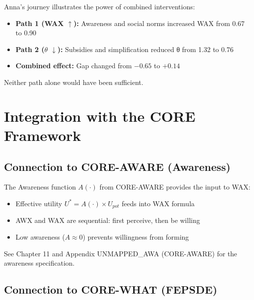 \begin{intuition}
Anna's journey illustrates the power of combined interventions:
\begin{itemize}[nosep]
  \item \textbf{Path 1 (WAX $\uparrow$):} Awareness and social norms increased WAX from 0.67 to 0.90
  \item \textbf{Path 2 ($\theta$ $\downarrow$):} Subsidies and simplification reduced θ from 1.32 to 0.76
  \item \textbf{Combined effect:} Gap changed from $-0.65$ to $+0.14$
\end{itemize}
Neither path alone would have been sufficient.
\end{intuition}



\section{Integration with the CORE Framework}
\label{sec:12-integration}


\subsection{Connection to CORE-AWARE (Awareness)}

\begin{cross-reference}
The Awareness function $A(\cdot)$ from CORE-AWARE provides the input to WAX:
\begin{itemize}[nosep]
  \item Effective utility $U^* = A(\cdot) \times U_{pot}$ feeds into WAX formula
  \item AWX and WAX are sequential: first perceive, then be willing
  \item Low awareness ($A \approx 0$) prevents willingness from forming
\end{itemize}
See Chapter 11 and Appendix UNMAPPED_AWA (CORE-AWARE) for the awareness specification.
\end{cross-reference}

\subsection{Connection to CORE-WHAT (FEPSDE)}

